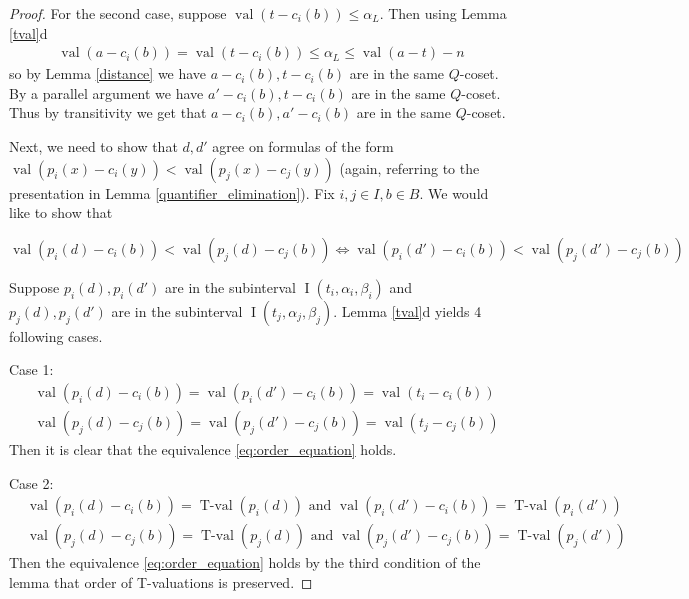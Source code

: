 \documentclass{amsart}
\DeclareMathOperator{\val}{val}
\DeclareMathOperator{\vval}{val}
\DeclareMathOperator{\tval}{T-val}
\DeclareMathOperator{\inti}{I}
\begin{document}
\begin{proof}
  For the second case, suppose $\val(t - c_i(b)) \leq \alpha_L$.
  Then using Lemma \ref{tval}d
  \begin{align*}
    \val(a - c_i(b)) = \val(t - c_i(b)) \leq \alpha_L \leq \val(a - t) - n
  \end{align*}
  so by Lemma \ref{distance} we have $a - c_i(b), t - c_i(b)$ are in the same $Q$-coset.
  By a parallel argument we have $a' - c_i(b), t - c_i(b)$ are in the same $Q$-coset.
  Thus by transitivity we get that $a - c_i(b), a' - c_i(b)$ are in the same $Q$-coset.

  Next, we need to show that $d, d'$ agree on formulas of the form
  $\vval (p_i(x) - c_i(y)) < \vval (p_j(x) - c_j(y))$ 
  (again, referring to the presentation in Lemma \ref{quantifier_elimination}).
  Fix $i,j \in I, b \in B$.
  We would like to show that 

  \begin{equation} \label {eq:order_equation}
    \vval (p_i(d) - c_i(b)) < \vval (p_j(d) - c_j(b))  \iff \vval (p_i(d') - c_i(b)) < \vval (p_j(d') - c_j(b))
  \end{equation}

  Suppose $p_i(d), p_i(d')$ are in the subinterval $\inti(t_i, \alpha_i, \beta_i)$ and 
  $p_j(d), p_j(d')$ are in the subinterval $\inti(t_j, \alpha_j, \beta_j)$.
  Lemma \ref{tval}d yields 4 following cases.

  Case 1:
  \begin{align*}
    &\vval (p_i(d) - c_i(b)) = \vval (p_i(d') - c_i(b)) = \vval(t_i - c_i(b)) \\
    &\vval (p_j(d) - c_j(b)) = \vval (p_j(d') - c_j(b)) = \vval(t_j - c_j(b))
  \end{align*}
  Then it is clear that the equivalence \eqref{eq:order_equation} holds.

  Case 2:
  \begin{align*}
    &\vval (p_i(d) - c_i(b)) = \tval(p_i(d)) \text{ and } \vval (p_i(d') - c_i(b)) = \tval(p_i(d')) \\
    &\vval (p_j(d) - c_j(b)) = \tval(p_j(d)) \text{ and } \vval (p_j(d') - c_j(b)) = \tval(p_j(d'))
  \end{align*}
  Then the equivalence \eqref{eq:order_equation} holds by the third condition of the lemma that order of T-valuations is preserved.


\end{proof}
\end{document}
